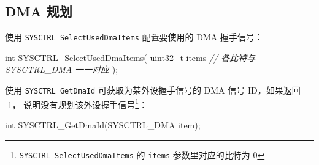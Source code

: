 \documentclass[
  12pt,
]{book}
\newenvironment{Shaded}{\begin{snugshade}}{\end{snugshade}}
\newcommand{\CommentTok}[1]{\textcolor[rgb]{0.56,0.35,0.01}{\textit{#1}}}
\newcommand{\DataTypeTok}[1]{\textcolor[rgb]{0.13,0.29,0.53}{#1}}
\newcommand{\NormalTok}[1]{#1}
\begin{document}
\hypertarget{dma-ux89c4ux5212-1}{%
\subsection{DMA 规划}\label{dma-ux89c4ux5212-1}}

使用 \texttt{SYSCTRL\_SelectUsedDmaItems} 配置要使用的 DMA 握手信号：

\begin{Shaded}
\begin{Highlighting}[]
\DataTypeTok{int}\NormalTok{ SYSCTRL_SelectUsedDmaItems(}
  \DataTypeTok{uint32_t}\NormalTok{ items }\CommentTok{// 各比特与 SYSCTRL_DMA 一一对应}
\NormalTok{  );}
\end{Highlighting}
\end{Shaded}

使用 \texttt{SYSCTRL\_GetDmaId} 可获取为某外设握手信号的 DMA 信号 ID，如果返回 -1，
说明没有规划该外设握手信号\footnote{\texttt{SYSCTRL\_SelectUsedDmaItems} 的 \texttt{items} 参数里对应的比特为 0}：

\begin{Shaded}
\begin{Highlighting}[]
\DataTypeTok{int}\NormalTok{ SYSCTRL_GetDmaId(SYSCTRL_DMA item);}
\end{Highlighting}
\end{Shaded}

  

\backmatter
\printindex
\end{document}
